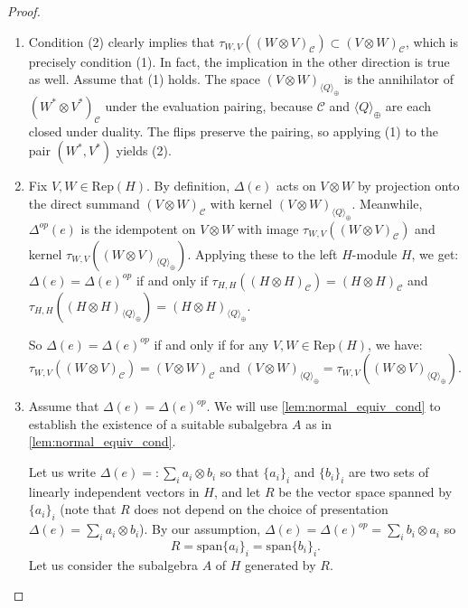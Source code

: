 \documentclass{amsart}
\theoremstyle{plain}%
\theoremstyle{remark}
\newcommand{\C}{\mathcal{C}}
\newcommand{\1}{\mathbbm{1}}
\newcommand{\Rep}{\mathrm{Rep}}
\begin{document}
    
    \begin{proof}\mbox{}
    
    \begin{enumerate}
    \item[\textbf{[(1) $\Longleftrightarrow$ (2)]}] Condition (2) clearly implies that $\tau_{W, V}\left((W\otimes V)_{\mathcal{C}}\right)\subset (V\otimes W)_{\C}$, which is precisely condition (1). In fact, the implication in the other direction is true as well. Assume that (1) holds. The space $(V\otimes W)_{\langle Q\rangle_{\oplus}}$ is the annihilator of $({W^*}\otimes {V^*})_\C$ under the evaluation pairing, because $\C$ and ${\langle Q\rangle_{\oplus}}$ are each closed under duality. The flips preserve the pairing, so applying (1) to the pair $({W^*},{V^*})$ yields (2).
        \item[\textbf{[(2) $\Longleftrightarrow$ (3)]}] Fix $V, W\in \Rep(H)$. By definition, $\Delta(e) $ acts on $V\otimes W$ by projection onto the direct summand $(V\otimes W)_{\C}$ with kernel $(V\otimes W)_{\langle Q\rangle_{\oplus}}$. Meanwhile, $\Delta^{op}(e)$ is the idempotent on $V\otimes W$ with image $\tau_{W, V}\left((W\otimes V)_{\mathcal{C}}\right)$ and kernel $\tau_{W, V}\left((W\otimes V)_{\langle Q\rangle_{\oplus}}\right)$. 
        Applying these to the left $H$-module $H$, we get: $ \Delta(e)=\Delta(e)^{op}$ if and only if $\tau_{H, H}\left((H\otimes H)_{\C}\right)=(H\otimes H)_{\C}$ and $\tau_{H, H}\left((H\otimes H)_{\langle Q\rangle_{\oplus}}\right)=(H\otimes H)_{\langle Q\rangle_{\oplus}}$.
        
        So $ \Delta(e)=\Delta(e)^{op}$ if and only if for any $V, W\in \Rep(H)$, we have: $\tau_{W, V}\left((W\otimes V)_{\mathcal{C}}\right)=(V\otimes W)_{\C}$ and $(V\otimes W)_{\langle Q\rangle_{\oplus}}=\tau_{W, V}\left((W\otimes V)_{\langle Q\rangle_{\oplus}}\right)$. 


        \item[\textbf{[(3) $\Longrightarrow$ (4)]}] Assume that $\Delta(e)=\Delta(e)^{op}$. 
        We will use \cref{lem:normal_equiv_cond} to establish the existence of a suitable subalgebra $A$ as in \cref{lem:normal_equiv_cond}.
        
        Let us write $\Delta(e) =: \sum_i a_i\otimes b_i$ so that $\{a_i\}_i$ and $\{b_i\}_i$ are two sets of linearly independent vectors in $H$, and let $R$ be the vector space spanned by $\{a_i\}_i$ (note that $R$ does not depend on the choice of presentation $\Delta(e) = \sum_i a_i\otimes b_i$). By our assumption, $\Delta(e)=\Delta(e)^{op}= \sum_i b_i\otimes a_i$ so 
        $$R=\mathrm{span}\{a_i\}_i=\mathrm{span}\{b_i\}_i.$$
        Let us consider the subalgebra $A$ of $H$ generated by $R$.
        

\end{enumerate}
\end{proof}
\end{document}
